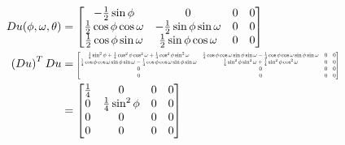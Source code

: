 \documentclass[12pt]{article}
\newcommand*{\Scale}[2][4]{\scalebox{#1}{$#2$}}%
\begin{document}
\begin{align}
  Du(\phi, \omega, \theta) &= \begin{bmatrix} -\frac{1}{2}\sin\phi & 0 & 0 & 0 \\ \frac{1}{2}\cos\phi\cos\omega & -\frac{1}{2}\sin\phi\sin\omega & 0 & 0\\  \frac{1}{2}\cos\phi\sin\omega & \frac{1}{2}\sin\phi\cos\omega & 0 & 0\end{bmatrix} \\
  \left(Du\right)^TDu &= \Scale[0.50]{\begin{bmatrix} 
\frac{1}{4}\sin^2\phi + \frac{1}{4}\cos^2\phi\cos^2\omega+ \frac{1}{4}\cos^2\phi\sin^2\omega
&  \frac{1}{4}\cos\phi\cos\omega\sin\phi\sin\omega - \frac{1}{4}\cos\phi\cos\omega\sin\phi\sin\omega 
& 0 & 0
\\ \frac{1}{4}\cos\phi\cos\omega\sin\phi\sin\omega - \frac{1}{4}\cos\phi\cos\omega\sin\phi\sin\omega 
& \frac{1}{4}\sin^2\phi\sin^2\omega + \frac{1}{4}\sin^2\phi\cos^2\omega
& 0 & 0
\\ 0
& 0
& 0 & 0\\ 0
& 0
& 0 & 0 \end{bmatrix}} \\
 &= \Scale[1.00]{\begin{bmatrix} 
\frac{1}{4}
& 0
& 0 & 0
\\ 0 
& \frac{1}{4}\sin^2\phi
& 0 & 0
\\ 0
& 0
& 0 & 0\\ 0
& 0
& 0 & 0 \end{bmatrix}}
\end{align} \\
\end{document}
